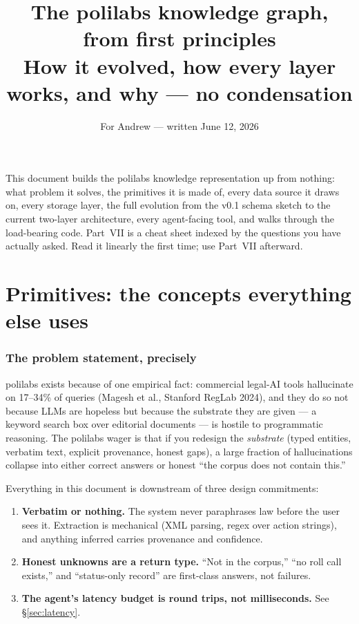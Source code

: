 \documentclass[11pt]{article}
\title{The polilabs knowledge graph, from first principles\\
\large How it evolved, how every layer works, and why --- no condensation}
\author{For Andrew --- written June 12, 2026}
\date{}
\begin{document}
\maketitle
\tableofcontents
\bigskip

\noindent This document builds the polilabs knowledge representation up from
nothing: what problem it solves, the primitives it is made of, every data
source it draws on, every storage layer, the full evolution from the v0.1
schema sketch to the current two-layer architecture, every agent-facing tool,
and walks through the load-bearing code. Part~VII is a cheat sheet indexed by
the questions you have actually asked. Read it linearly the first time; use
Part~VII afterward.

\part{Primitives: the concepts everything else uses}

\section{The problem statement, precisely}
\label{sec:problem}

polilabs exists because of one empirical fact: commercial legal-AI tools
hallucinate on 17--34\% of queries (Magesh et al., Stanford RegLab 2024), and
they do so not because LLMs are hopeless but because the substrate they are
given --- a keyword search box over editorial documents --- is hostile to
programmatic reasoning. The polilabs wager is that if you redesign the
\emph{substrate} (typed entities, verbatim text, explicit provenance, honest
gaps), a large fraction of hallucinations collapse into either correct answers
or honest ``the corpus does not contain this.''

Everything in this document is downstream of three design commitments:

\begin{enumerate}[itemsep=2pt]
  \item \textbf{Verbatim or nothing.} The system never paraphrases law before
        the user sees it. Extraction is mechanical (XML parsing, regex over
        action strings), and anything inferred carries provenance and
        confidence.
  \item \textbf{Honest unknowns are a return type.} ``Not in the corpus,''
        ``no roll call exists,'' and ``status-only record'' are first-class
        answers, not failures.
  \item \textbf{The agent's latency budget is round trips, not milliseconds.}
        See \S\ref{sec:latency}.
\end{enumerate}
\end{document}
